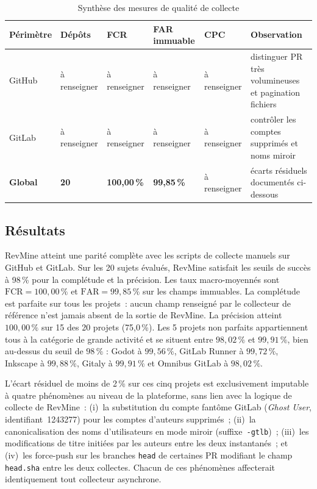\begin{table}[H]
\centering
\small
\caption{Synthèse des mesures de qualité de collecte}
\label{tab:resultats-qualite-collecte}
\begin{tabular}{|>{\raggedright\arraybackslash}p{2.6cm}
                |>{\centering\arraybackslash}p{1.8cm}
                |>{\centering\arraybackslash}p{2cm}
                |>{\centering\arraybackslash}p{2cm}
                |>{\centering\arraybackslash}p{2cm}
                |>{\raggedright\arraybackslash}p{3cm}|}
\hline
\textbf{Périmètre} & \textbf{Dépôts} & \textbf{FCR} & \textbf{FAR immuable} & \textbf{CPC} & \textbf{Observation} \\
\hline
GitHub & à renseigner & à renseigner & à renseigner & à renseigner & distinguer PR très volumineuses et pagination fichiers \\
\hline
GitLab & à renseigner & à renseigner & à renseigner & à renseigner & contrôler les comptes supprimés et noms miroir \\
\hline
\textbf{Global} & \textbf{20} & \textbf{100,00\,\%} & \textbf{99,85\,\%} & à renseigner & écarts résiduels documentés ci-dessous \\
\hline
\end{tabular}
\end{table}

\subsection{Résultats}

RevMine atteint une parité complète avec les scripts de collecte manuels sur GitHub et GitLab.
Sur les 20 sujets évalués, RevMine satisfait les seuils de succès à 98\,\% pour la complétude
et la précision. Les taux macro-moyennés sont $\mathrm{FCR} = 100{,}00\,\%$ et
$\mathrm{FAR} = 99{,}85\,\%$ sur les champs immuables. La complétude est parfaite sur tous les
projets~: aucun champ renseigné par le collecteur de référence n'est jamais absent de la sortie
de RevMine. La précision atteint $100{,}00\,\%$ sur 15 des 20 projets (75,0\,\%). Les 5 projets non parfaits appartiennent tous à la catégorie de grande activité et se situent entre \(98{,}02\,\%\) et \(99{,}91\,\%\), bien au-dessus du seuil de \(98\,\%\) : Godot à \(99{,}56\,\%\), GitLab Runner à \(99{,}72\,\%\), Inkscape à \(99{,}88\,\%\), Gitaly à \(99{,}91\,\%\) et Omnibus GitLab à \(98{,}02\,\%\).

L'écart résiduel de moins de 2\,\% sur ces cinq projets est exclusivement imputable à quatre
phénomènes au niveau de la plateforme, sans lien avec la logique de collecte de RevMine~:
(i)~la substitution du compte fantôme GitLab (\textit{Ghost User}, identifiant~1243277) pour
les comptes d'auteurs supprimés~; (ii)~la canonicalisation des noms d'utilisateurs en mode miroir
(suffixe~\texttt{-gtlb})~; (iii)~les modifications de titre initiées par les auteurs entre les
deux instantanés~; et (iv)~les force-push sur les branches \texttt{head} de certaines PR modifiant
le champ \texttt{head.sha} entre les deux collectes. Chacun de ces phénomènes affecterait
identiquement tout collecteur asynchrone.

